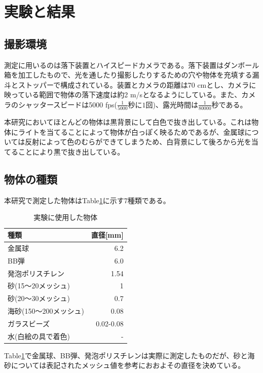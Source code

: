 \documentclass[a4paper,12pt,dvipdfmx]{jsarticle}
\begin{document}
\section{実験と結果}
\subsection{撮影環境}
測定に用いるのは落下装置とハイスピードカメラである。落下装置はダンボール箱を加工したもので、光を通したり撮影したりするための穴や物体を充填する漏斗とストッパーで構成されている。装置とカメラの距離は70 cmとし、カメラに映っている範囲で物体の落下速度は約2 m/sとなるようにしている。また、カメラのシャッタースピードは5000 fps($\frac{1}{5000}秒に1回$)、露光時間は$\frac{1}{80000}秒$である。 \par
本研究においてほとんどの物体は黒背景にして白色で抜き出している。これは物体にライトを当てることによって物体が白っぽく映るためであるが、金属球については反射によって色のむらができてしまうため、白背景にして後ろから光を当てることにより黒で抜き出している。
\subsection{物体の種類}
本研究で測定した物体はTable\ref{tb:ballkind}に示す7種類である。 \\
\begin{table}[H]
	\caption{実験に使用した物体 \label{tb:ballkind}}
	\begin{tabular}{lr}
		\toprule
		種類 & 直径[mm] \\
		\midrule
		金属球 & 6.2 \\
		BB弾 & 6.0 \\
		発泡ポリスチレン & 1.54 \\
		砂(15〜20メッシュ) & 1 \\
		砂(20〜30メッシュ) & 0.7 \\
		海砂(150〜200メッシュ) & 0.08 \\
		ガラスビーズ & 0.02-0.08 \\
		水(白絵の具で着色) & - \\
		\bottomrule
	\end{tabular}
\end{table}

Table\ref{tb:ballkind}で金属球、BB弾、発泡ポリスチレンは実際に測定したものだが、砂と海砂については表記されたメッシュ値を参考におおよその直径を決めている。 \par
\end{document}
